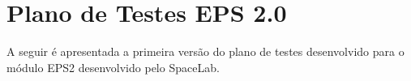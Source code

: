 \chapter{Plano de Testes EPS 2.0} \label{app:plano-testes-eps2}

A seguir é apresentada a primeira versão do plano de testes desenvolvido para o módulo \gls{EPS2} desenvolvido pelo SpaceLab.




